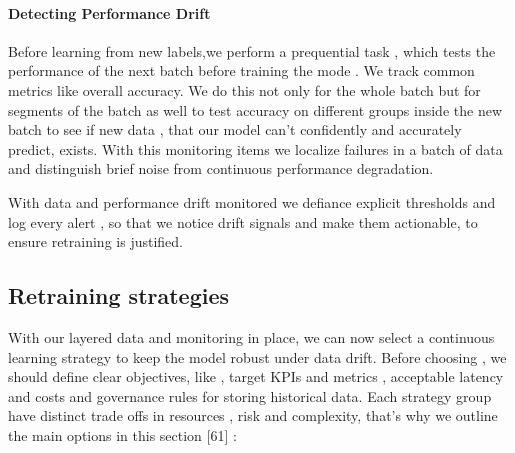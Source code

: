 \paragraph{Detecting Performance Drift}
Before learning from new labels,we perform a prequential task , which tests the performance of the next batch before training the mode \cite{cossu:202}. We track common metrics like overall accuracy. We do this not only for the whole batch but for segments of the batch as well to test accuracy on different groups inside the new batch to see if new data , that our model can’t confidently and accurately  predict, exists. With this monitoring items we localize failures in a batch of data and distinguish brief noise from continuous performance degradation.


With data and performance drift monitored we defiance explicit thresholds and log every alert , so that we notice drift signals and make them actionable, to ensure retraining is justified.


\subsection {Retraining strategies}
With our layered data and monitoring in place, we can now select a continuous learning strategy to keep the model robust under data drift. Before choosing , we should define clear objectives, like , target KPIs and metrics , acceptable latency and costs and governance rules for storing historical data. Each strategy group have distinct trade offs in resources , risk and complexity, that’s why we outline the main options in this section [61] :


